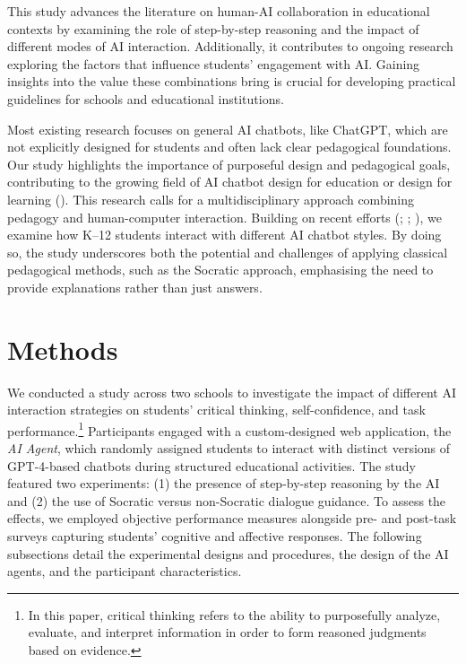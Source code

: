 \documentclass[
  11pt,
]{article}
\begin{document}
This study advances the literature on human-AI collaboration in educational contexts by examining the role of step-by-step reasoning and the impact of different modes of AI interaction. Additionally, it contributes to ongoing research exploring the factors that influence students' engagement with AI. Gaining insights into the value these combinations bring is crucial for developing practical guidelines for schools and educational institutions.

Most existing research focuses on general AI chatbots, like ChatGPT, which are not explicitly designed for students and often lack clear pedagogical foundations. Our study highlights the importance of purposeful design and pedagogical goals, contributing to the growing field of AI chatbot design for education or design for learning (). This research calls for a multidisciplinary approach combining pedagogy and human-computer interaction. Building on recent efforts (; ; ), we examine how K--12 students interact with different AI chatbot styles. By doing so, the study underscores both the potential and challenges of applying classical pedagogical methods, such as the Socratic approach, emphasising the need to provide explanations rather than just answers.

\section{Methods}\label{sec:methods}

We conducted a study across two schools to investigate the impact of different AI interaction strategies on students' critical thinking, self-confidence, and task performance.\footnote{
  In this paper, critical thinking refers to the ability to purposefully analyze, evaluate, and interpret information in order to form reasoned judgments based on evidence.} Participants engaged with a custom-designed web application, the \emph{AI Agent}, which randomly assigned students to interact with distinct versions of GPT-4-based chatbots during structured educational activities. The study featured two experiments: (1) the presence of step-by-step reasoning by the AI and (2) the use of Socratic versus non-Socratic dialogue guidance. To assess the effects, we employed objective performance measures alongside pre- and post-task surveys capturing students' cognitive and affective responses. The following subsections detail the experimental designs and procedures, the design of the AI agents, and the participant characteristics.
\end{document}
